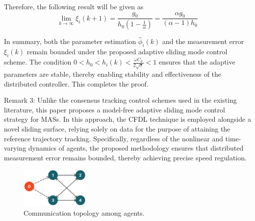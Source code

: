 \documentclass[journal,onecolumn]{IEEEtran}
\begin{document}
Therefore, the following result will be given as
\begin{equation}
    \label{model:lim_fin}
    \lim_{k \to \infty} \xi_i(k+1) = \frac{g_0}{h_0(1-\frac{1}{\alpha})} = \frac{\alpha g_0}{(\alpha-1)h_0}
\end{equation}

In summary, both the parameter estimation $\hat{\phi}_i(k)$ and the measurement error $\xi_i(k)$ remain bounded under the proposed adaptive sliding mode control scheme. The condition $0 < h_0 < h_i(k) < \frac{\omega C_0}{2\sqrt{\sigma}} < 1$ ensures that the adaptive parameters are stable, thereby enabling stability and effectiveness of the distributed controller. This completes the proof.


Remark 3: Unlike the consensus tracking control schemes used in the existing literature, this paper proposes a model-free adaptive sliding mode control strategy for MASs. In this approach, the CFDL technique is employed alongside a novel sliding surface, relying solely on data for the purpose of attaining the reference trajectory tracking. Specifically, regardless of the nonlinear and time-varying dynamics of agents, the proposed methodology ensures that distributed measurement error remains bounded, thereby achieving precise speed regulation.

\begin{figure}[H]
    \centering
    \includegraphics[width=0.3\textwidth]{communication.png}
    \caption{Communication topology among agents.}
    \label{fig:communication1} %
\end{figure}




\end{document}
